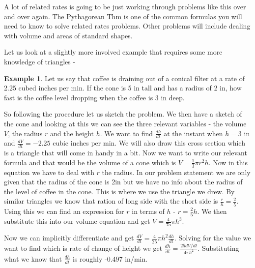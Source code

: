 \documentclass[12pt,reqno]{article}
\theoremstyle{definition}
\newtheorem*{Example}{Example}
\begin{document}
A lot of related rates is going to be just working through problems like this over and over again. The Pythagorean Thm is one of the common formulas you will need to know to solve related rates problems. Other problems will include dealing with volume and areas of standard shapes. 

Let us look at a slightly more involved example that requires some more knowledge of triangles - 
\begin{Example}
	Let us say that coffee is draining out of a conical filter at a rate of 2.25 cubed inches per min. If the cone is 5 in tall and has a radius of 2 in, how fast is the coffee level dropping when the coffee is 3 in deep. 
	
	So following the procedure let us sketch the problem. We then have a sketch of the cone and looking at this we can see the three relevant variables - the volume $V$, the radius $r$ and the height $h$. We want to find $\frac{dh}{dt}$  at the instant when $h = 3$ in and $\frac{dV}{dt} = - 2.25$ cubic inches per min. We will also draw this cross section which is a triangle that will come in handy in a bit. Now we want to write our relevant formula and that would be the volume of a cone which is $V = \frac{1}{3} \pi r^2 h$. Now in this equation we have to deal with $r$ the radius. In our problem statement we are only given that the radius of the cone is 2in but we have no info about the radius of the level of coffee in the cone. This is where we use the triangle we drew. By similar triangles we know that ration of long side with the short side is $\frac{r}{h} = \frac{2}{5}$. Using this we can find an expression for $r$ in terms of $h$ - $r = \frac{2}{5}h$. We then substitute this into our volume equation and get $V = \frac{4}{75}\pi h^3$. 
	
	Now we can implicitly differentiate and get $\frac{dV}{dt} = \frac{4}{25}\pi h^2 \frac{dh}{dt}$. Solving for the value we want to find which is rate of change of height we get $\frac{dh}{dt} = \frac{25 dV/dt}{4\pi h^2}$. Substituting what we know that $\frac{dh}{dt}$ is roughly -0.497 in/min. 
\end{Example}
\end{document}

